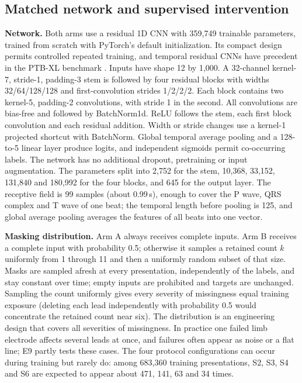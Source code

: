 \subsection{Matched network and supervised intervention}

\textbf{Network.} Both arms use a residual 1D CNN with 359,749 trainable parameters, trained from scratch with PyTorch's default initialization. Its compact design permits controlled repeated training, and temporal residual CNNs have precedent in the PTB-XL benchmark \citep{strodthoff2021benchmark}. Inputs have shape 12 by 1,000. A 32-channel kernel-7, stride-1, padding-3 stem is followed by four residual blocks with widths 32/64/128/128 and first-convolution strides 1/2/2/2. Each block contains two kernel-5, padding-2 convolutions, with stride 1 in the second. All convolutions are bias-free and followed by BatchNorm1d. ReLU follows the stem, each first block convolution and each residual addition. Width or stride changes use a kernel-1 projected shortcut with BatchNorm. Global temporal average pooling and a 128-to-5 linear layer produce logits, and independent sigmoids permit co-occurring labels. The network has no additional dropout, pretraining or input augmentation. The parameters split into 2,752 for the stem, 10,368, 33,152, 131,840 and 180,992 for the four blocks, and 645 for the output layer. The receptive field is 99 samples (about 0.99\,s), enough to cover the P wave, QRS complex and T wave of one beat; the temporal length before pooling is 125, and global average pooling averages the features of all beats into one vector.

\textbf{Masking distribution.} Arm A always receives complete inputs. Arm B receives a complete input with probability 0.5; otherwise it samples a retained count $k$ uniformly from 1 through 11 and then a uniformly random subset of that size. Masks are sampled afresh at every presentation, independently of the labels, and stay constant over time; empty inputs are prohibited and targets are unchanged. Sampling the count uniformly gives every severity of missingness equal training exposure (deleting each lead independently with probability 0.5 would concentrate the retained count near six). The distribution is an engineering design that covers all severities of missingness. In practice one failed limb electrode affects several leads at once, and failures often appear as noise or a flat line; E9 partly tests these cases. The four protocol configurations can occur during training but rarely do: among 683,360 training presentations, S2, S3, S4 and S6 are expected to appear about 471, 141, 63 and 34 times.

